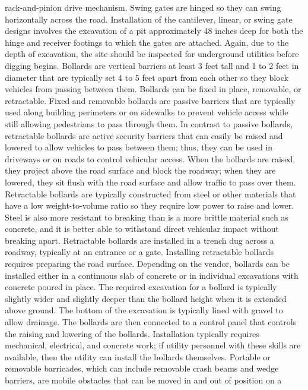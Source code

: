\documentclass{article}
\begin{document}
rack-and-pinion drive mechanism. Swing gates are hinged so they can
swing horizontally across the road. Installation of the cantilever,
linear, or swing gate designs involves the excavation of a pit
approximately 48 inches deep for both the hinge and receiver footings to
which the gates are attached. Again, due to the depth of excavation, the
site should be inspected for underground utilities before digging
begins. Bollards are vertical barriers at least 3 feet tall and 1 to 2
feet in diameter that are typically set 4 to 5 feet apart from each
other so they block vehicles from passing between them. Bollards can be
fixed in place, removable, or retractable. Fixed and removable bollards
are passive barriers that are typically used along building perimeters
or on sidewalks to prevent vehicle access while still allowing
pedestrians to pass through them. In contrast to passive bollards,
retractable bollards are active security barriers that can easily be
raised and lowered to allow vehicles to pass between them; thus, they
can be used in driveways or on roads to control vehicular access. When
the bollards are raised, they project above the road surface and block
the roadway; when they are lowered, they sit flush with the road surface
and allow traffic to pass over them. Retractable bollards are typically
constructed from steel or other materials that have a low
weight-to-volume ratio so they require low power to raise and lower.
Steel is also more resistant to breaking than is a more brittle material
such as concrete, and it is better able to withstand direct vehicular
impact without breaking apart. Retractable bollards are installed in a
trench dug across a roadway, typically at an entrance or a gate.
Installing retractable bollards requires preparing the road surface.
Depending on the vendor, bollards can be installed either in a
continuous slab of concrete or in individual excavations with concrete
poured in place. The required excavation for a bollard is typically
slightly wider and slightly deeper than the bollard height when it is
extended above ground. The bottom of the excavation is typically lined
with gravel to allow drainage. The bollards are then connected to a
control panel that controls the raising and lowering of the bollards.
Installation typically requires mechanical, electrical, and concrete
work; if utility personnel with these skills are available, then the
utility can install the bollards themselves. Portable or removable
barricades, which can include removable crash beams and wedge barriers,
are mobile obstacles that can be moved in and out of position on a
\end{document}
